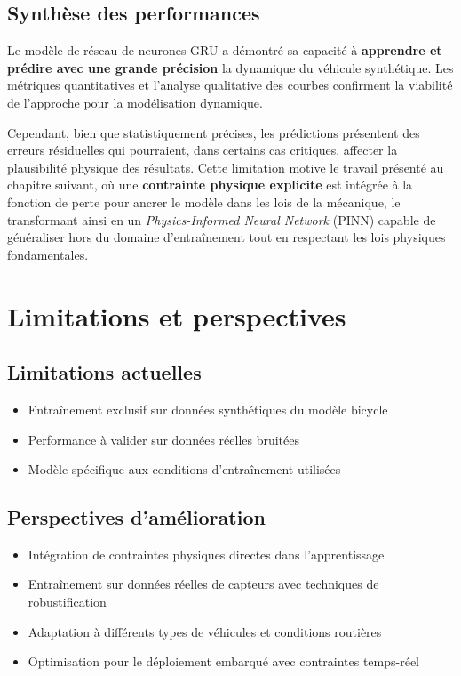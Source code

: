 \documentclass[12pt, a4paper]{report}
\begin{document}
\subsection{Synthèse des performances}

Le modèle de réseau de neurones GRU a démontré sa capacité à \textbf{apprendre et prédire avec une grande précision} la dynamique du véhicule synthétique. Les métriques quantitatives et l'analyse qualitative des courbes confirment la viabilité de l'approche pour la modélisation dynamique.

Cependant, bien que statistiquement précises, les prédictions présentent des erreurs résiduelles qui pourraient, dans certains cas critiques, affecter la plausibilité physique des résultats. Cette limitation motive le travail présenté au chapitre suivant, où une \textbf{contrainte physique explicite} est intégrée à la fonction de perte pour ancrer le modèle dans les lois de la mécanique, le transformant ainsi en un \textit{Physics-Informed Neural Network} (PINN) capable de généraliser hors du domaine d'entraînement tout en respectant les lois physiques fondamentales.

\section{Limitations et perspectives}
\label{sec:limitations}

\subsection{Limitations actuelles}
\begin{itemize}
    \item Entraînement exclusif sur données synthétiques du modèle bicycle
    \item Performance à valider sur données réelles bruitées
    \item Modèle spécifique aux conditions d'entraînement utilisées
\end{itemize}

\subsection{Perspectives d'amélioration}
\begin{itemize}
    \item Intégration de contraintes physiques directes dans l'apprentissage
    \item Entraînement sur données réelles de capteurs avec techniques de robustification
    \item Adaptation à différents types de véhicules et conditions routières
    \item Optimisation pour le déploiement embarqué avec contraintes temps-réel
\end{itemize}
\newpage
\end{document}

